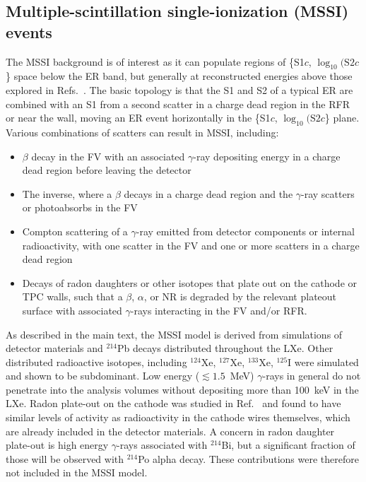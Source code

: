 \subsection{Multiple-scintillation single-ionization (MSSI) events}
The MSSI background is of interest as it can populate regions of \{S1$c$, $\log_{10}(\mathrm{S}2c$\} space below the ER band, but generally at reconstructed energies above those explored in Refs.~\cite{LZ:SR1WS_2022, LZ:SR3_WS2024}. The basic topology is that the S1 and S2 of a typical ER are combined with an S1 from a second scatter in a charge dead region in the RFR or near the wall, moving an ER event horizontally in the \{S1$c$, $\log_{10}(\mathrm{S}2c$\} plane. Various combinations of scatters can result in MSSI, including:
\begin{itemize}
    \item{$\beta$ decay in the FV with an associated $\gamma$-ray depositing energy in a charge dead region before leaving the detector}
    \item{The inverse, where a $\beta$ decays in a charge dead region and the $\gamma$-ray scatters or photoabsorbs in the FV}
    \item{Compton scattering of a $\gamma$-ray emitted from detector components or internal radioactivity, with one scatter in the FV and one or more scatters in a charge dead region}
    \item{Decays of radon daughters or other isotopes that plate out on the cathode or TPC walls, such that a $\beta$, $\alpha$, or NR is degraded by the relevant plateout surface with associated $\gamma$-rays interacting in the FV and/or RFR.}
\end{itemize}

As described in the main text, the MSSI model is derived from simulations of detector materials  and $^{214}$Pb decays distributed throughout the LXe. Other distributed radioactive isotopes, including $^{124}$Xe, $^{127}$Xe, $^{133}$Xe, $^{125}$I were simulated and shown to be subdominant. Low energy ($\lesssim 1.5$~MeV) $\gamma$-rays in general do not penetrate into the analysis volumes without depositing more than 100~keV in the LXe. Radon plate-out on the cathode was studied in Ref.~\cite{LZ:2026hpq} and found to have similar levels of activity as radioactivity in the cathode wires themselves, which are already included in the detector materials. A concern in radon daughter plate-out is high energy $\gamma$-rays associated with $^{214}$Bi, but a significant fraction of those will be observed with $^{214}$Po alpha decay. These contributions were therefore not included in the MSSI model. 

